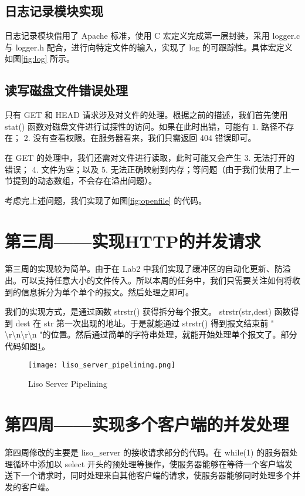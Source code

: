 \subsection{日志记录模块实现}
日志记录模块借用了 Apache 标准，使用 C 宏定义完成第一层封装，采用 logger.c 与 logger.h 配合，进行向特定文件的输入，实现了 log 的可跟踪性。具体宏定义如图\ref{fig:log} 所示。

\subsection{读写磁盘文件错误处理}
只有 GET 和 HEAD 请求涉及对文件的处理。根据之前的描述，我们首先使用 stat() 函数对磁盘文件进行试探性的访问。如果在此时出错，可能有 1. 路径不存在； 2. 没有查看权限。在服务器看来，我们只需返回 404 错误即可。

在 GET 的处理中，我们还需对文件进行读取，此时可能又会产生 3. 无法打开的错误； 4. 文件为空；以及 5. 无法正确映射到内存；等问题（由于我们使用了上一节提到的动态数组，不会存在溢出问题）。

考虑完上述问题，我们实现了如图\ref{fig:openfile} 的代码。

\section{第三周——实现HTTP的并发请求}

第三周的实现较为简单。由于在 Lab2 中我们实现了缓冲区的自动化更新、防溢出。可以支持任意大小的文件传入。所以本周的任务中，我们只需要关注如何将收到的信息拆分为单个单个的报文。然后处理之即可。

我们的实现方式，是通过函数 strstr() 获得拆分每个报文。 strstr(str,dest) 函数得到 dest 在 str 第一次出现的地址。于是就能通过 strstr() 得到报文结束前 " \textbackslash r\textbackslash n\textbackslash r\textbackslash n "的位置。然后通过简单的字符串处理，就能开始处理单个报文了。部分代码如图\ref{fig:liso_server_pipelining}。

\begin{figure}[htbp!]
    \centering
    \texttt{[image: liso\_server\_pipelining.png]}
    \caption{Liso Server Pipelining}\label{fig:liso_server_pipelining}
\end{figure}

\section{第四周——实现多个客户端的并发处理}

第四周修改的主要是 liso\_server 的接收请求部分的代码。在 while(1) 的服务器处理循环中添加以 select 开头的预处理等操作，使服务器能够在等待一个客户端发送下一个请求时，同时处理来自其他客户端的请求，使服务器能够同时处理多个并发的客户端。


